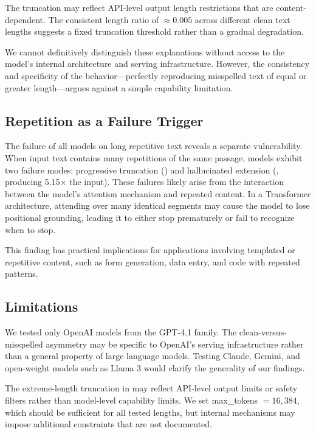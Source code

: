 The truncation may reflect API-level output length restrictions that are content-dependent. The consistent length ratio of $\approx 0.005$ across different clean text lengths suggests a fixed truncation threshold rather than a gradual degradation.

We cannot definitively distinguish these explanations without access to the model's internal architecture and serving infrastructure. However, the consistency and specificity of the behavior---perfectly reproducing misspelled text of equal or greater length---argues against a simple capability limitation.

\subsection{Repetition as a Failure Trigger}

The failure of all models on long repetitive text reveals a separate vulnerability. When input text contains many repetitions of the same passage, models exhibit two failure modes: progressive truncation (\gptomini) and hallucinated extension (\gptmini, producing 5.15$\times$ the input). These failures likely arise from the interaction between the model's attention mechanism and repeated content. In a Transformer architecture, attending over many identical segments may cause the model to lose positional grounding, leading it to either stop prematurely or fail to recognize when to stop.

This finding has practical implications for applications involving templated or repetitive content, such as form generation, data entry, and code with repeated patterns.

\subsection{Limitations}

We tested only OpenAI models from the GPT-4.1 family. The clean-versus-misspelled asymmetry may be specific to OpenAI's serving infrastructure rather than a general property of large language models. Testing Claude, Gemini, and open-weight models such as Llama 3 would clarify the generality of our findings.

The extreme-length truncation in \gptfull may reflect API-level output limits or safety filters rather than model-level capability limits. We set max\_tokens $= 16{,}384$, which should be sufficient for all tested lengths, but internal mechanisms may impose additional constraints that are not documented.


